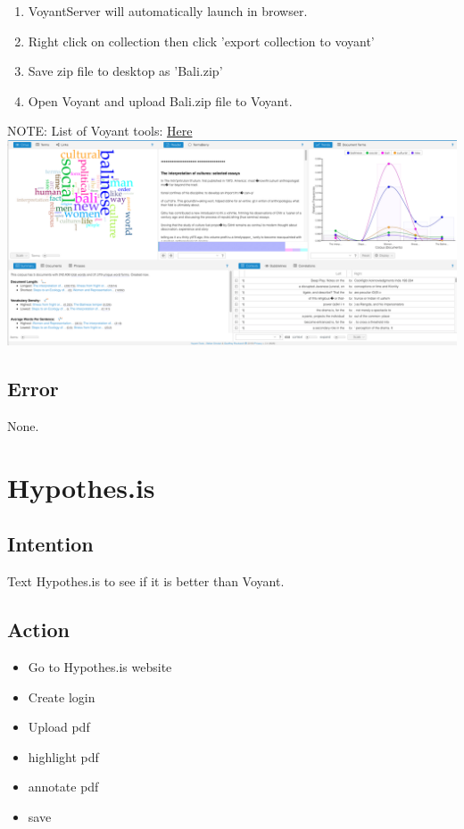 \documentclass{article}
\begin{document}
\begin{enumerate}
    \item VoyantServer will automatically launch in browser. 
    \item Right click on collection then click 'export collection to voyant'
    \item Save zip file to desktop as 'Bali.zip'
    \item Open Voyant and upload Bali.zip file to Voyant. 
\end{enumerate}
NOTE: List of Voyant tools: \href{https://voyant-tools.org/docs/#!/guide/tools}{Here}\\
\includegraphics[width=15cm]{voyant.png}

\subsection{Error}
None.

\section{Hypothes.is}
\subsection{Intention}
Text Hypothes.is to see if it is better than Voyant.
\subsection{Action}
\begin{itemize}
    \item Go to Hypothes.is website
    \item Create login
    \item Upload pdf 
    \item highlight pdf 
    \item annotate pdf
    \item save 
\end{itemize}
\end{document}
